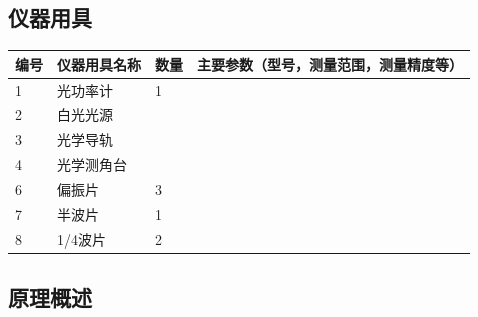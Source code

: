 \documentclass[dvipsnames, svgnames,a4paper,11pt]{article}
\begin{document}
	\subsection{仪器用具}
	\begin{table}[htbp]
		\centering
		\renewcommand\arraystretch{1.6}
		\begin{tabular}{p{}|p{}|p{}|p{}}
			\hline
			编号& 仪器用具名称 & 数量 &  主要参数（型号，测量范围，测量精度等） \\
			\hline
			1&光功率计 	&1 	& \\
			
			2&白光光源 	& 	&  \\
			
			3&光学导轨 	&  & \\
			
			4&光学测角台& & \\
			
			6&偏振片	&3 & \\
			
			7&半波片	&1 & \\
			
			8&1/4波片	&2 & \\
			\hline
		\end{tabular}
	\end{table}
	
	\subsection{原理概述}
	
\end{document}
